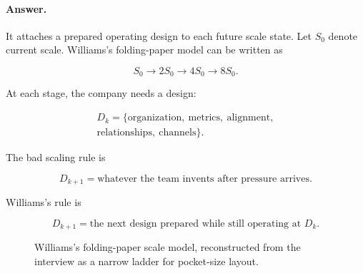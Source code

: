 \documentclass[11pt,oneside]{book}
\begin{document}
\paragraph{Answer.}
It attaches a prepared operating design to each future scale state. Let \(S_0\) denote current scale. Williams's folding-paper model can be written as

\begin{equation}
S_0 \longrightarrow 2S_0 \longrightarrow 4S_0 \longrightarrow 8S_0.
\end{equation}

At each stage, the company needs a design:

\begin{equation}
\begin{gathered}
D_k=\{\mathrm{organization},\ \mathrm{metrics},\ \mathrm{alignment},\\
\mathrm{relationships},\ \mathrm{channels}\}.
\end{gathered}
\end{equation}

The bad scaling rule is

\begin{equation}
D_{k+1}=\text{whatever the team invents after pressure arrives}.
\end{equation}

Williams's rule is

\begin{equation}
D_{k+1}=\text{the next design prepared while still operating at }D_k.
\end{equation}

\begin{figure}
\centering
{}
\caption{Williams's folding-paper scale model, reconstructed from the interview as a narrow ladder for pocket-size layout.}
\end{figure}
\end{document}
